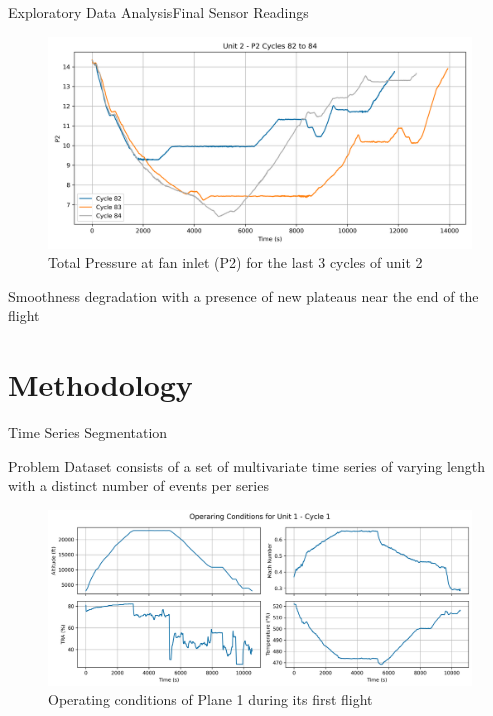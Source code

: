 \documentclass{beamer}
\begin{document}
        \begin{frame}{Exploratory Data Analysis}{Final Sensor Readings}
            \begin{figure}[!htbp]
                \centering
                \includegraphics[scale=0.35]{unit_2_P2_cycles_82_84.png}
                \caption{Total Pressure at fan inlet (P2) for the last 3 cycles of unit 2}
            \end{figure}
            Smoothness degradation with a presence of new plateaus near the end of the flight
        \end{frame}

    \section{Methodology}

        \begin{frame}{Time Series Segmentation}

            \begin{alertblock}{Problem}
                Dataset consists of a set of multivariate time series of varying length with a distinct number of events per series
            \end{alertblock}
            \begin{figure}[!htbp]
                \centering
                \includegraphics[scale=0.3]{operating_conditions_unit_1_cycle_1.png}
                \caption{Operating conditions of Plane 1 during its first flight}
            \end{figure}

        \end{frame}
\end{document}
